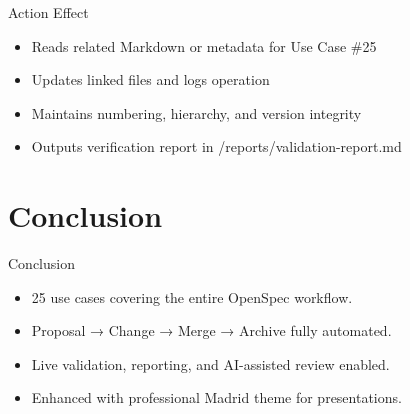 \documentclass[aspectratio=169]{beamer}
\begin{document}
\begin{frame}{Action Effect}
\begin{itemize}
  \item Reads related Markdown or metadata for Use Case \#25
  \item Updates linked files and logs operation
  \item Maintains numbering, hierarchy, and version integrity
  \item Outputs verification report in /reports/validation-report.md
\end{itemize}
\end{frame}


\section{Conclusion}
\begin{frame}{Conclusion}
\begin{itemize}
  \item 25 use cases covering the entire OpenSpec workflow.
  \item Proposal → Change → Merge → Archive fully automated.
  \item Live validation, reporting, and AI-assisted review enabled.
  \item Enhanced with professional Madrid theme for presentations.
\end{itemize}
\end{frame}
\end{document}
